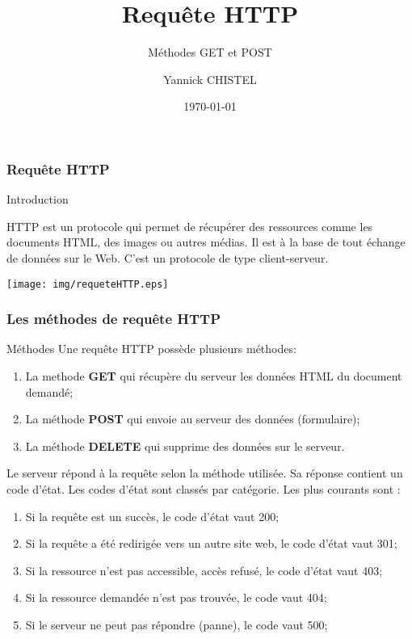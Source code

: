 \documentclass[8pt]{beamer}
\title{Requête HTTP}
\subtitle{Méthodes GET et POST}
\author{Yannick CHISTEL}
\institute{Lycée Dumont d'Urville - CAEN}
\date{\today}
\newcounter{num}
\begin{document}
 
\frame{\titlepage}

\begin{frame}
\frametitle{Requête HTTP}

\begin{block}{Introduction}

HTTP est un protocole qui permet de récupérer des ressources comme les documents HTML, des images ou autres médias. Il est à la base de tout échange de données sur le Web. C'est un protocole de type client-serveur.

\begin{center}
\texttt{[image: img/requeteHTTP.eps]}
\end{center}
\end{block}

\end{frame}


\begin{frame}
\frametitle{Les méthodes de requête HTTP}

\begin{block}{Méthodes}
Une requête HTTP possède plusieurs méthodes:
\begin{enumerate}
\item La methode \textbf{GET} qui récupère du serveur les données HTML du document demandé;
\item La méthode \textbf{POST} qui envoie au serveur des données (formulaire);
\item La méthode \textbf{DELETE} qui supprime des données sur le serveur.
\end{enumerate}

Le serveur répond à la requête selon la méthode utilisée. Sa réponse contient un code d'état. Les codes d'état sont classés par catégorie. Les plus courants sont :
\begin{enumerate}
\item Si la requête est un succès, le code d'état vaut 200;
\item Si la requête a été redirigée vers un autre site web, le code d'état vaut 301;
\item Si la ressource n'est pas accessible, accès refusé, le code d'état vaut 403;
\item Si la ressource demandée n'est pas trouvée, le code vaut 404;
\item Si le serveur ne peut pas répondre (panne), le code vaut 500;
\end{enumerate} 


\end{block}
\end{frame}
\end{document}
